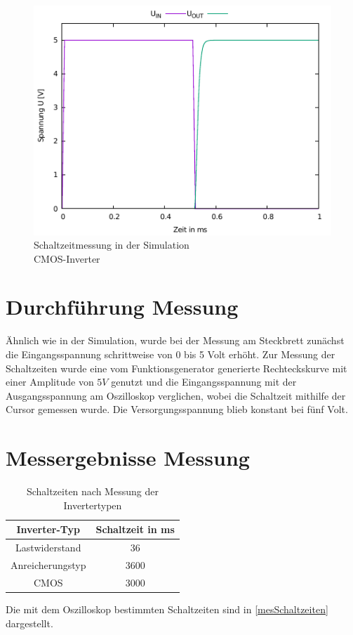\documentclass[11pt, a4paper]{article}
\begin{document}
\begin{figure}
    \centering
    \includegraphics[width=\linewidth]{simTimeCMOS.pdf}
    \caption{Schaltzeitmessung in der Simulation \\ CMOS-Inverter}
    \label{simTimeCMOS}
\end{figure}
\section*{Durchführung Messung}
Ähnlich wie in der Simulation, wurde bei der Messung am Steckbrett zunächst die Eingangsspannung schrittweise von 0 bis 5 Volt erhöht. 
Zur Messung der Schaltzeiten wurde eine vom Funktionsgenerator generierte Rechteckskurve mit einer Amplitude von $5V$ genutzt und die Eingangsspannung mit der Ausgangsspannung am Oszilloskop verglichen, wobei die Schaltzeit mithilfe der Cursor gemessen wurde.
Die Versorgungsspannung blieb konstant bei fünf Volt.
\section*{Messergebnisse Messung}
\begin{table}[h]
\centering
\begin{tabular}{c|c}
Inverter-Typ & Schaltzeit in ms \\ \hline
Lastwiderstand & $36$ \\
Anreicherungstyp & $3600$ \\
CMOS & $3000$
\end{tabular}
\caption{Schaltzeiten nach Messung der Invertertypen}
\label{mesSchaltzeiten}
\end{table}
Die mit dem Oszilloskop bestimmten Schaltzeiten sind in \autoref{mesSchaltzeiten} dargestellt.
\end{document}
